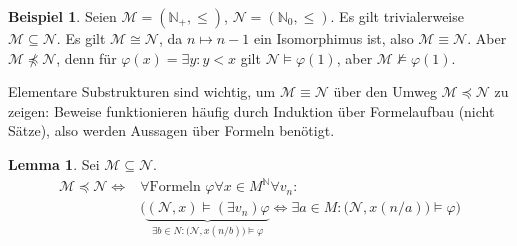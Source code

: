 \documentclass{article}
\theoremstyle{definition}
\newtheorem{lem}[dfn]{Lemma}
\newtheorem*{bsp}{Beispiel}
\theoremstyle{plain}
\newcommand{\m}[1]{\mathcal{#1}}
\begin{document}
    \begin{bsp}
        Seien $ \m{M} = (\mathbb{N}_+, \leq) $, $ \m{N} = (\mathbb{N}_0, \leq) $.
        Es gilt trivialerweise $ \m{M} \subseteq \m{N} $.
        Es gilt $ \m{M} \cong \m{N} $, da $ n \mapsto n - 1 $ ein Isomorphimus ist, also $ \m{M} \equiv \m{N}$.
        Aber $ \m{M} \not \preceq \m{N} $, denn für $ \varphi(x) = \exists y: y < x $ gilt $ \m{N} \models \varphi(1) $, aber $ \m{M} \not \models \varphi(1) $.
    \end{bsp}

    Elementare Substrukturen sind wichtig, um $ \m{M} \equiv \m{N} $ über den Umweg $ \m{M} \preceq \m{N} $ zu zeigen: Beweise funktionieren häufig durch Induktion über Formelaufbau (nicht Sätze), also werden Aussagen über Formeln benötigt.

    \begin{lem}
    \label{lem:elem-substr}
        Sei $ \m{M} \subseteq \m{N} $.
        \begin{align*}
            \m{M} \preceq \m{N} \Leftrightarrow & \forall \text{Formeln }\varphi \forall x \in M^\mathbb{N} \forall v_n: \\
            & \bigg( \underbrace{(\m{N}, x) \models (\exists v_n)\varphi}_{\exists b \in N: \big(\m{N}, x(n/b)\big) \models \varphi} \Leftrightarrow \exists a \in M : \big(\m{N}, x(n/a)\big) \models \varphi \bigg)
        \end{align*}
    \end{lem}
\end{document}
